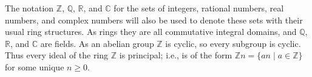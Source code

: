 The notation $\mathbb{Z}$, $\mathbb{Q}$, $\mathbb{R}$, and $\mathbb{C}$ for the sets of integers, rational numbers, real numbers, and complex numbers will also be used to denote these sets with their usual ring structures. As rings they are all commutative integral domains, and $\mathbb{Q}$, $\mathbb{R}$, and $\mathbb{C}$ are fields. As an abelian group $\mathbb{Z}$ is cyclic, so every subgroup is cyclic. Thus every ideal of the ring $\mathbb{Z}$ is principal; i.e., is of the form $\mathbb{Z}n = \{an \mid a \in \mathbb{Z}\}$ for some unique $n \geq 0$.
